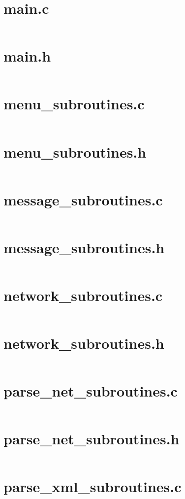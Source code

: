 \documentclass[letterpaper,twoside]{article}
\begin{document}
\section{main.c}
\inputminted[breaklines]{c}{../src/main.c}
\newpage
\section{main.h}
\inputminted[breaklines]{c}{../src/main.h}
\newpage
\section{menu\_subroutines.c}
\inputminted[breaklines]{c}{../src/menu_subroutines.c}
\newpage
\section{menu\_subroutines.h}
\inputminted[breaklines]{c}{../src/menu_subroutines.h}
\newpage
\section{message\_subroutines.c}
\inputminted[breaklines]{c}{../src/message_subroutines.c}
\newpage
\section{message\_subroutines.h}
\inputminted[breaklines]{c}{../src/message_subroutines.h}
\newpage
\section{network\_subroutines.c}
\inputminted[breaklines]{c}{../src/network_subroutines.c}
\newpage
\section{network\_subroutines.h}
\inputminted[breaklines]{c}{../src/network_subroutines.h}
\newpage
\section{parse\_net\_subroutines.c}
\inputminted[breaklines]{c}{../src/parse_net_subroutines.c}
\newpage
\section{parse\_net\_subroutines.h}
\inputminted[breaklines]{c}{../src/parse_net_subroutines.h}
\newpage
\section{parse\_xml\_subroutines.c}
\inputminted[breaklines]{c}{../src/parse_xml_subroutines.c}
\newpage
\end{document}

